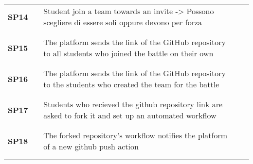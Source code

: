 \begin{longtable}[H]{l l p{8.5cm} l l}
     \textbf{SP14} & \vline & {\color{red}Student join a team towards an invite -> Possono scegliere di essere soli oppure devono per forza}                                     & \vline &                        \\
                   &        &                                                                                                                                       &        &                        \\\hline & & & & \\
     \textbf{SP15}             & \vline & The platform sends the link of the GitHub repository to all students who joined the battle on their own                               & \vline &                        \\
                               &        &                                                                                                                                       &        &                        \\\hline & & & & \\
     \textbf{SP16}             & \vline & The platform sends the link of the GitHub repository to the students who created the team for the battle                              & \vline &                        \\
                               &        &                                                                                                                                       &        &                        \\\hline & & & & \\
     \textbf{SP17}             & \vline & Students who recieved the github repository link are asked to fork it and set up an automated workflow                                & \vline &                        \\
                               &        &                                                                                                                                       &        &                        \\\hline & & & & \\
     \textbf{SP18}             & \vline & The forked repository's workflow notifies the platform of a new github push action                                                    & \vline &                        \\
                               &        &                                                                                                                                       &        &                        \\\hline & & & & \\

\end{longtable}
